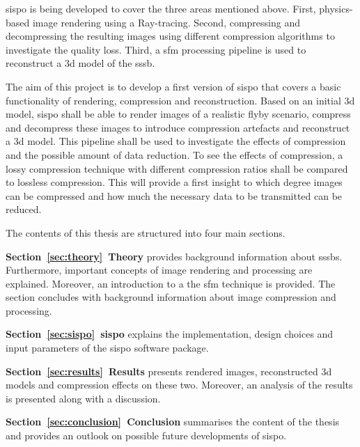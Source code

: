 
\gls{sispo} is being developed to cover the three areas mentioned above. First, physics-based image rendering using a Ray-tracing. Second, compressing and decompressing the resulting images using different compression algorithms to investigate the quality loss. Third, a \gls{sfm} processing pipeline is used to reconstruct a \gls{3d} model of the \gls{sssb}.

The aim of this project is to develop a first version of \gls{sispo} that covers a basic functionality of rendering, compression and reconstruction. Based on an initial \gls{3d} model, \gls{sispo} shall be able to render images of a realistic flyby scenario, compress and decompress these images to introduce compression artefacts and reconstruct a \gls{3d} model. This pipeline shall be used to investigate the effects of compression and the possible amount of data reduction. To see the effects of compression, a lossy compression technique with different compression ratios shall be compared to lossless compression. This will provide a first insight to which degree images can be compressed and how much the necessary data to be transmitted can be reduced.

The contents of this thesis are structured into four main sections. 

\textbf{Section~\ref{sec:theory}~Theory} provides background information about \glspl{sssb}. Furthermore, important concepts of image rendering and processing are explained. Moreover, an introduction to a the \gls{sfm} technique is provided. The section concludes with background information about image compression and processing.

\textbf{Section~\ref{sec:sispo}~\acrlong{sispo}} explains the implementation, design choices and input parameters of the \gls{sispo} software package.

\textbf{Section~\ref{sec:results}~Results} presents rendered images, reconstructed \gls{3d} models and compression effects on these two. Moreover, an analysis of the results is presented along with a discussion.

\textbf{Section~\ref{sec:conclusion}~Conclusion} summarises the content of the thesis and provides an outlook on possible future developments of \gls{sispo}.

